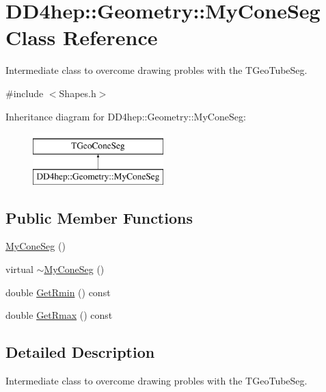 \hypertarget{class_d_d4hep_1_1_geometry_1_1_my_cone_seg}{}\section{D\+D4hep\+:\+:Geometry\+:\+:My\+Cone\+Seg Class Reference}
\label{class_d_d4hep_1_1_geometry_1_1_my_cone_seg}


Intermediate class to overcome drawing probles with the T\+Geo\+Tube\+Seg.  




{\ttfamily \#include $<$Shapes.\+h$>$}

Inheritance diagram for D\+D4hep\+:\+:Geometry\+:\+:My\+Cone\+Seg\+:\begin{figure}[H]
\begin{center}
\leavevmode
\includegraphics[height=2.000000cm]{class_d_d4hep_1_1_geometry_1_1_my_cone_seg}
\end{center}
\end{figure}
\subsection*{Public Member Functions}
\begin{DoxyCompactItemize}
\item 
\hyperlink{class_d_d4hep_1_1_geometry_1_1_my_cone_seg_a9979507bda1f61e91e7859b4b6144025}{My\+Cone\+Seg} ()
\item 
virtual \hyperlink{class_d_d4hep_1_1_geometry_1_1_my_cone_seg_a0042f0670c9b2367a0b8512564fc9b80}{$\sim$\+My\+Cone\+Seg} ()
\item 
double \hyperlink{class_d_d4hep_1_1_geometry_1_1_my_cone_seg_ad05f78f0e94fcf5c5c48657bd7498f28}{Get\+Rmin} () const
\item 
double \hyperlink{class_d_d4hep_1_1_geometry_1_1_my_cone_seg_a49ac16f5bbc2d48fe93c94f2ead255d8}{Get\+Rmax} () const
\end{DoxyCompactItemize}


\subsection{Detailed Description}
Intermediate class to overcome drawing probles with the T\+Geo\+Tube\+Seg. 

